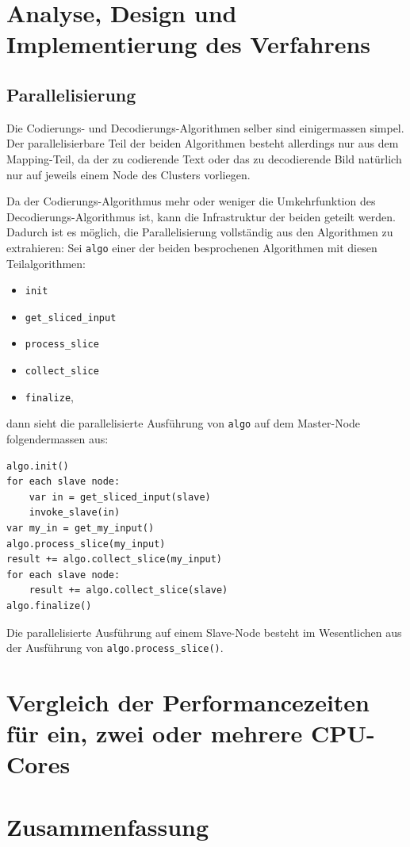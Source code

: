 \documentclass[11pt]{scrreprt} %
\theoremstyle{definition}
\begin{document}
\chapter{Analyse, Design und Implementierung des Verfahrens}

\section{Parallelisierung}

Die Codierungs- und Decodierungs-Algorithmen selber sind einigermassen simpel. Der parallelisierbare Teil der beiden Algorithmen besteht allerdings nur aus dem Mapping-Teil, da der zu codierende Text oder das zu decodierende Bild natürlich nur auf jeweils einem Node des Clusters vorliegen.

Da der Codierungs-Algorithmus mehr oder weniger die Umkehrfunktion des Decodierungs-Algorithmus ist, kann die Infrastruktur der beiden geteilt werden. Dadurch ist es möglich, die Parallelisierung vollständig aus den Algorithmen zu extrahieren: Sei {\tt algo} einer der beiden besprochenen Algorithmen mit diesen Teilalgorithmen:
\begin{itemize}
\item {\tt init}
\item {\tt get\_sliced\_input}
\item {\tt process\_slice}
\item {\tt collect\_slice}
\item {\tt finalize},
\end{itemize}

dann sieht die parallelisierte Ausführung von {\tt algo} auf dem Master-Node folgendermassen aus:

\begin{verbatim}
algo.init()
for each slave node:
    var in = get_sliced_input(slave)
    invoke_slave(in)
var my_in = get_my_input()
algo.process_slice(my_input)
result += algo.collect_slice(my_input)
for each slave node:
    result += algo.collect_slice(slave)
algo.finalize()
\end{verbatim}

Die parallelisierte Ausführung auf einem Slave-Node besteht im Wesentlichen aus der Ausführung von {\tt algo.process\_slice()}.


\chapter{Vergleich der Performancezeiten für ein, zwei oder mehrere CPU-Cores}

\chapter{Zusammenfassung}




\listoffigures
\listoftables
\end{document}
